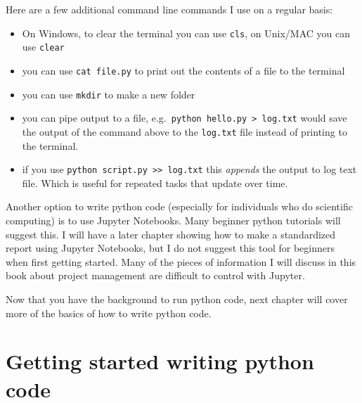 \documentclass[
  letterpaper,
]{scrbook}
\providecommand{\tightlist}{%
  \setlength{\itemsep}{0pt}\setlength{\parskip}{0pt}}\usepackage{longtable,booktabs,array}
\begin{document}
\begin{tcolorbox}[enhanced jigsaw, toprule=.15mm, rightrule=.15mm, arc=.35mm, opacityback=0, coltitle=black, bottomrule=.15mm, left=2mm, opacitybacktitle=0.6, bottomtitle=1mm, colback=white, colframe=quarto-callout-note-color-frame, colbacktitle=quarto-callout-note-color!10!white, titlerule=0mm, breakable, title={Note}, toptitle=1mm, leftrule=.75mm]

Here are a few additional command line commands I use on a regular
basis:

\begin{itemize}
\tightlist
\item
  On Windows, to clear the terminal you can use \texttt{cls}, on
  Unix/MAC you can use \texttt{clear}
\item
  you can use \texttt{cat\ file.py} to print out the contents of a file
  to the terminal
\item
  you can use \texttt{mkdir} to make a new folder
\item
  you can pipe output to a file,
  e.g.~\texttt{python\ hello.py\ \textgreater{}\ log.txt} would save the
  output of the command above to the \texttt{log.txt} file instead of
  printing to the terminal.
\item
  if you use
  \texttt{python\ script.py\ \textgreater{}\textgreater{}\ log.txt} this
  \emph{appends} the output to log text file. Which is useful for
  repeated tasks that update over time.
\end{itemize}

\end{tcolorbox}

Another option to write python code (especially for individuals who do
scientific computing) is to use Jupyter Notebooks. Many beginner python
tutorials will suggest this. I will have a later chapter showing how to
make a standardized report using Jupyter Notebooks, but I do not suggest
this tool for beginners when first getting started. Many of the pieces
of information I will discuss in this book about project management are
difficult to control with Jupyter.

Now that you have the background to run python code, next chapter will
cover more of the basics of how to write python code.


\chapter{Getting started writing python code}\label{sec-started}
\end{document}
